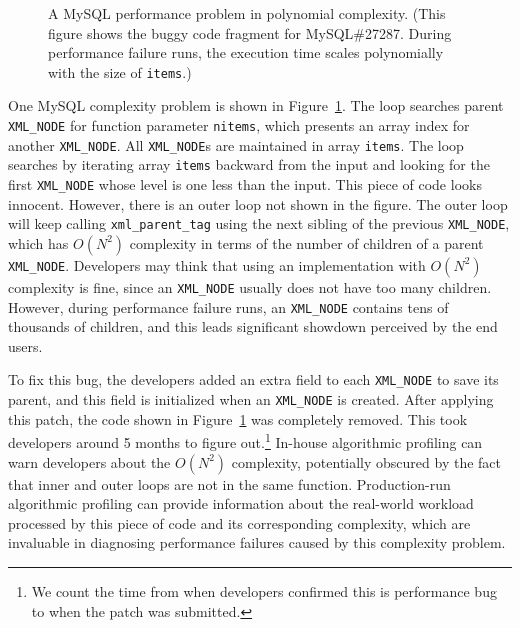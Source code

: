 \begin{figure}
\centering
{}
  \mbox{}
\caption{A MySQL performance problem in polynomial complexity. 
\footnotesize{(This figure shows the buggy code fragment for MySQL\#27287. 
   During performance failure runs, 
   the execution time scales polynomially with the size of \texttt{items}.)}}
\vspace{-0.05in}
\label{fig:mysql27287}
\vspace{-0.05in}
\end{figure}


One MySQL complexity problem is shown in Figure~\ref{fig:mysql27287}.
The loop searches parent \texttt{XML\_NODE} for function parameter \texttt{nitems}, 
which presents an array index for another \texttt{XML\_NODE}.
All \texttt{XML\_NODE}s are maintained in array \texttt{items}. 
The loop searches by iterating array \texttt{items} 
backward from the input and looking for the first \texttt{XML\_NODE} 
whose level is one less than the input.
This piece of code looks innocent. 
However, there is an outer loop not shown in the figure.
The outer loop will keep calling \texttt{xml\_parent\_tag} using 
the next sibling of the previous \texttt{XML\_NODE}, 
which has $O(N^2)$ complexity in terms of the number of children of a parent \texttt{XML\_NODE}. 
Developers may think that using an implementation with $O(N^2)$ complexity is fine, 
since an \texttt{XML\_NODE} usually does not have too many children.
However, during performance failure runs, 
an \texttt{XML\_NODE} contains tens of thousands of children, 
and this leads significant showdown perceived by the end users. 

To fix this bug, the developers added an extra field to each \texttt{XML\_NODE} to save its parent, 
and this field is initialized when an \texttt{XML\_NODE} is created. 
After applying this patch, the code shown in Figure~\ref{fig:mysql27287} was completely removed.
This took developers around 5 months to figure 
out.\footnote{We count the time from when developers confirmed this is performance bug 
to when the patch was submitted.} 
In-house algorithmic profiling can warn developers about the $O(N^2)$ complexity, 
potentially obscured by the fact that inner and outer loops are not in the same function. 
Production-run algorithmic profiling can provide information about the real-world workload 
processed by this piece of code and its corresponding complexity,
which are invaluable in diagnosing performance failures caused by this complexity problem. 



